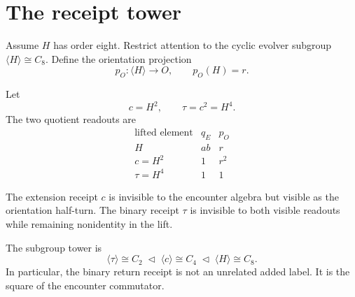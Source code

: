 \section{The receipt tower}

Assume \(H\) has order eight. Restrict attention to the cyclic evolver
subgroup \(\langle H\rangle\cong C_8\). Define the orientation
projection
\[
p_O:\langle H\rangle\longrightarrow O,
\qquad
p_O(H)=r.
\]

Let
\[
c=H^2,
\qquad
\tau=c^2=H^4.
\]
The two quotient readouts are
\[
\begin{array}{c|c|c}
\text{lifted element} & q_E & p_O\\
\hline
H & ab & r\\
c=H^2 & 1 & r^2\\
\tau=H^4 & 1 & 1
\end{array}
\]

The extension receipt \(c\) is invisible to the encounter algebra but
visible as the orientation half-turn. The binary receipt \(\tau\) is
invisible to both visible readouts while remaining nonidentity in the
lift.

The subgroup tower is
\[
\langle\tau\rangle\cong C_2
\;\triangleleft\;
\langle c\rangle\cong C_4
\;\triangleleft\;
\langle H\rangle\cong C_8.
\]
In particular, the binary return receipt is not an unrelated added
label. It is the square of the encounter commutator.
